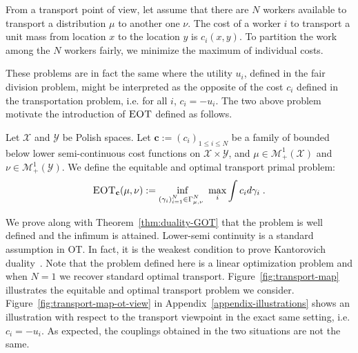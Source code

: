 From a transport point of view, let assume that there are $N$ workers available to transport a distribution $\mu$ to another one $\nu$. The cost of a worker $i$ to transport a unit mass from location $x$ to the location $y$ is $c_i(x,y)$. To partition the work among the $N$ workers fairly, we minimize the maximum of individual costs. 

These problems are in fact the same where the utility $u_i$, defined in the fair division problem, might be interpreted as the opposite of the cost $c_i$ defined in the transportation problem, i.e. for all $i$, $c_i = -u_i$. The two above problem motivate the introduction of $\textsc{EOT}$ defined as follows.
\begin{definition}
\label{def-mot}
Let $\mathcal{X}$ and $\mathcal{Y}$ be Polish spaces. Let $\mathbf{c}:=(c_i)_{1\leq i\leq N}$ be a family of bounded below lower semi-continuous cost functions on $\mathcal{X}\times \mathcal{Y}$, and $\mu\in\mathcal{M}^1_+(\mathcal{X})$ and  $\nu\in\mathcal{M}^1_+(\mathcal{Y})$. We define the equitable and optimal transport primal problem:
\begin{align}
\label{eq-primal}
\textsc{EOT}_{\mathbf{c}}(\mu,\nu) := \inf_{\substack{(\gamma_i)_{i=1}^N\in\Gamma^N_{\mu,\nu}\
}}   \max_i \int c_i d\gamma_i\; .
\end{align}
\end{definition}

We prove along with Theorem~\ref{thm:duality-GOT} that the problem is well defined and the infimum is attained. Lower-semi continuity is a standard assumption in OT. In fact, it is the weakest condition to prove Kantorovich duality~\citep[Chap. 1]{villani2003topics}. Note that the problem defined here is a linear optimization problem and when $N=1$ we recover standard optimal transport. Figure~\ref{fig:transport-map} illustrates the equitable and optimal transport problem we consider. Figure~\ref{fig:transport-map-ot-view} in Appendix~\ref{appendix-illustrations} shows an illustration with respect to the transport viewpoint in the exact same setting, i.e. $c_i = - u_i$. As expected, the couplings obtained in the two situations are not the same. 

